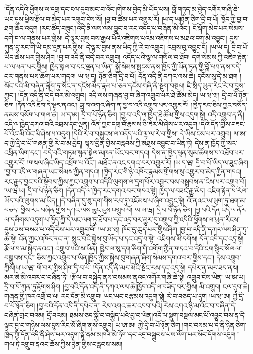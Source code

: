 །དོན་འདིའི་ཕྱོགས་ལ་དགྲ་དང་ངལ་དུབ་མང་བ་འོང་།གེགས་བྱེད་མི་ཡོད་པས། བློ་གཏད་མ་བྱེད་འགོར་གཞི་ཆེ་ཡང་དུས་ཕྱིས་རྩོལ་བ་མེད་པར་འགྲུབ་ངེས་སོ། །བྱ་བ་ཚིམ་པར་འགྱུར་རོ། །ཡ་ད་ཡ།ཉོན་ཅིག་དྲི་བ་པོ། ཁྱོད་ཀྱི་བྱ་བ་ཐག་ཆོད་འདུག །རང་ཚོད་བཟུང་།འདི་ནི་ལས་ལས་བྱུང་བ་རང་འདོད་པ་བཞིན་མི་འོང་། ངོ་ལྐོག་མེད་པར་སེམས་དགེ་བ་ལ་གནས་པར་གྱིས། དེ་ལྟར་བྱས་བས་རྒྱལ་པོའི་འཇིགས་པའམ་འཇིགས་པ་མཐའ་དག་མི་འབྱུང་། དུས་ཀུན་དུ་རང་གི་ཡི་དམ་དྲན་པར་གྱིས། དེ་ལྟར་བྱས་ནས་ཡིད་ཀྱི་རེ་བ་འགྲུབ། འབྲས་བུ་འབྱུང་ངོ། །ཡ་ཡ་ད། དྲི་བ་པོ་ཡིད་ཆེས་པར་གྱིས་ཤིག །བྱ་བ་འདི་ནི་བདེ་བར་འགྲུབ། འདོད་པའི་ལྷ་ལ་གསོལ་བ་ཐོབ། དགེ་སེམས་ཀྱི་འཇིག་རྟེན་པ་ལ་ཕན་པར་གྱིས། ཁྱེད་སྐལ་བ་དང་ལྡན་པ་ཡིན། སྐྱོ་སེམས་སྤངས་ནས་ཁྱོད་ཀྱི་ཡོན་ཏན་གྱི་བློ་ཕབ་ནས་བདེ་བར་གནས་པས་ཆོག་པར་གདའ། ཡ་ཝ་ད། ཉོན་ཅིག་དྲི་བ་པོ། དོན་འདི་ནི་དཀའ་ལས་ཆེ། དངོས་སུ་དེ་མ་ཐག །སོང་བའི་མི་བཞིན་ལྐོག་ཏུ་སོང་ན་དངོས་མེད་རྣམ་པ་ཅན་དངོས་གཞི་ནི་སྡུག་བསྔལ། ཇི་སྲིད་ཡུན་རིང་རེ་བ་བྱས་ཀྱང་། །དོན་འདི་ནི་བདེ་བར་མི་འགྲུབ། འདི་ལས་གཞན་བྱ་བ་ཞིག་འགྲུབ་པར་ཐེ་ཚོམ་མེད། ཡ་ཝ་ཝ། དྲི་བ་པོ་ཉོན་ཅིག །དོན་འདི་ཐོབ་དེ་ལྟར་ནའང་། ཟླ་བ་འགའ་ཞིག་ན་བྱ་བ་འདི་འགྲུབ་པར་འགྱུར་རོ། །ཁྱེད་རང་ཅིས་ཀྱང་བསོད་ནམས་བསོག་པ་གལ་ཆེ། ཡ་ད་ཨ། དྲི་བ་པོ་ཉོན་ཅིག །བྱ་བ་འདི་ལ་ཁྱེད་ཐེ་ཚོམ་གྱིས་འདུག་སྟེ། འདི་འགྲུབ་ན་ནི། འདི་ལ་ཁྱེད་དགའ་བའི་འབྲས་དང་ལྡན། འོན་ཀྱང་དགྲ་བོ་རྣམས་ཅི་ཟེར་མི་ཤེས་པར་འདུག །དེའི་དོན་གྱིས་བཟང་པོ་འོང་མི་འོང་མི་ཤེས་པ་འདུག །དེའི་རེ་བ་བསྐྱུངས་ལ་འདོད་པའི་ལྷ་ལ་རེ་བ་གྱིས། དེ་ཡིས་ངེས་པར་འགྲུབ། ཡ་ཨ་ད།ཀྱེ་དྲི་བ་པོ་གཞན་གྱི་རེ་བ་མ་བྱེད། ལྷས་བྱིན་གྱིས་བརླབས་ཀྱི་མཐུས་འབྱུང་བ་ཡིན་ཏེ། དེས་ན་ཁྱོད་ཀྱི་སར་འཕྲིན་ཡིག་དང་། བདེ་བའི་གཏམ་སྙན་སྐྱེལ་མཁན་ཡོང་བར་གདའ། དེས་ན་ཁྱེད་ཕུན་སུམ་ཚོགས་པ་འཐོབ་པར་འགྱུར་རོ། །གསལ་ཞིང་ཡིད་འཕྲོག་པ་འོང་། མཐོང་ནའང་དགའ་བར་འགྱུར་རོ། །ཡ་ད་ཝ། དྲི་བ་པོ་ཡིད་ལ་ཟུང་ཞིག །བྱ་བ་འདི་ལ་གཞན་ཡང་སེམས་ཀྱིན་གདའ། །ཁྱེད་རང་གི་ཉེ་འཁོར་རྣམས་གྲོགས་སུ་འགྱུར་བ་མེད་ཀྱིན་གདའ། རང་རྒྱུད་བྱང་བའི་སྟོབས་ཀྱིས་ཀྱང་འགྲུབ་པ་འདིའི་ལུགས་ལ་དྲག་པོར་འགྱུར་བས་བསྒྲུབས་ན་ངེས་པར་འགྲུབ་བོ། །ཡ་ཝ་ཡ། དྲི་བ་པོ་ཉོན་ཅིག །དོན་འདི་ལ་ཁྱེད་རང་དགའ་བར་གདའ་སྟེ། ཁྱེད་ལ་བཟང་རྒྱུ་མེད། འཇིག་རྟེན་ཕ་རོལ་ཡོད་པའི་ལུགས་མ་ཡིན། །དེ་བཞིན་དུ་སུ་དག་གིས་རབ་ཏུ་འཇོམས་པ་ཞིག་འབྱུང་སྟེ། འོ་ནའང་ཡ་ཡུག་ཏུ་ཐག་མ་བཅད། ཕྱིས་རང་བཞིན་གྱིས་དཀའ་ལས་ཆུང་ངུས་འགྲུབ་པོ། ཡ་ཡ་ཝ། དྲི་བ་པོ་ཉོན་ཅིག །བྱ་བའི་དོན་འདི་ལ་ནོར་ལ་དམིགས་འདུག་པ་ཁྱོད་ཀྱི་དེ་ཡང་ལག་ཏུ་ཐོབ་པ་དང་འདྲ་བར་མྱུར་དུ་འགྲུབ་ཀྱི་འདིའི་ཕྱོགས་ལ་ཡུན་རིངས་དུས་ནས་བསམ་པ་འདི་ངེས་པར་འགྲུབ་བོ། །ཡ་ཨ་ཝ། ཁོང་དུ་ཆུད་པར་གྱིས་ཤིག །བྱ་བ་འདི་ནི་དཀའ་ལས་ཤིན་ཏུ་ཆེ་སྟེ། འོན་ཀྱང་འཁོར་ནང་ན། སྲུང་བའི་སྐྱེས་བུ་ཡོད་པ་དང་འདྲ་བ་སྟེ། འཇིགས་མི་དགོས། དོན་འདི་དང་འདྲ་སྟེ། རྩོལ་བ་མ་སྐྱེད་ནའང་། འགྲུབ་པའི་ས་ཡིན། ཁྱེད་ལ་སུ་དག་ཅིག་གི་འགོག་ཀྱིན་གདའ་བ་དེའི་ངག་ཕྱིར་སོལ་ལ་བསྒྲུབས་དང་། ཅིས་ཀྱང་འགྲུབ་པ་ཡིན།ཁྱོད་ཀྱིས་སྐྱེས་བུ་གཞན་ཞིག་སེམས་དགའ་བར་གྱིས་དང་། དེས་འགྲུབ་ཀྱིས།ཡ་ཡ་ཝ། གོ་བར་གྱིས་ཤིག་དྲི་བ་པོ། །དོན་འདི་ནི་མར་མེའི་སྡོང་རས་དང་འདྲ་སྟེ། དཔེར་ན་མར་ཟད་ནས། མར་མེ་མི་འབར་བ་བཞིན་ཏེ། །རྩོལ་བ་བསྐྱེད་ནས་བསམས་ནའང་འགོར་གཞི་ཆེ་སྟེ། འགྲུབ་ངེས་ཡིན། ཡ་ཨ་ཡ། དྲི་བ་པོ་ཀུན་ཏུ་རྟོགས་ཤིག །བྱ་བའི་དོན་འདི་ནི་དཀའ་ལས་ཆེ།ཁྱོད་འདི་ལ་བཟོད་བར་གྱིས། མི་འགྲུབ། ངལ་དུབ་ཆེ། གཞན་གྱི་ཁར་འགྲོ་བ་ལ། རང་དོན་མི་འགྲུབ། ཡང་ཡང་བརྩམས་འདུག་སྟེ། རེ་བ་བཅད་པ་དྲག །ཡ་ཝ་ཨ། ཀྱེ་དྲི་བ་པོ་ཉོན་ཅིག །བྱ་བའི་དོན་འདི་ནི་དཔེར་ན། རེས་འགའ་ཆར་འབབ་པའི། རེས་འགའ་ཉི་མ་འོང་བ་བཞིན།དེ་བཞིན་གྲང་བའམ། དྲོ་བའམ། ཐམས་ཅད་སྐྱོ་བ་བསྐྱེད་པའི་བྱ་བ་ཡིན།འདི་ལ་སྡུག་བསྔལ་མང་པོ་འབྱུང་བས་ན་དེ་ལྟར་བྱ་བ་གཉིས་ལས་དུས་རིང་མོ་ཞིག་ནས་འགྲུབ། ཡ་ཨ་ཨ། ཀྱེ་དྲི་བ་པོ་ཉོན་ཅིག །གང་བསམ་པ་དེ་ནི་ཉིན་ཅིག་ཁྱེད་ཀྱི་དོན་འདི་ནི་ཤེས་པར་འདུག་སྟེ་ནམ་མཁའི་མེ་ཏོག་དང་འདྲ་བསྒྲུབས་པས་ལོག་པར་སོང་དོགས་འདུག །གལ་ཏེ་འགྲུབ་ནའང་ཆོས་ཀྱིས་བྱིན་གྱིས་བརླབས་སམ། 